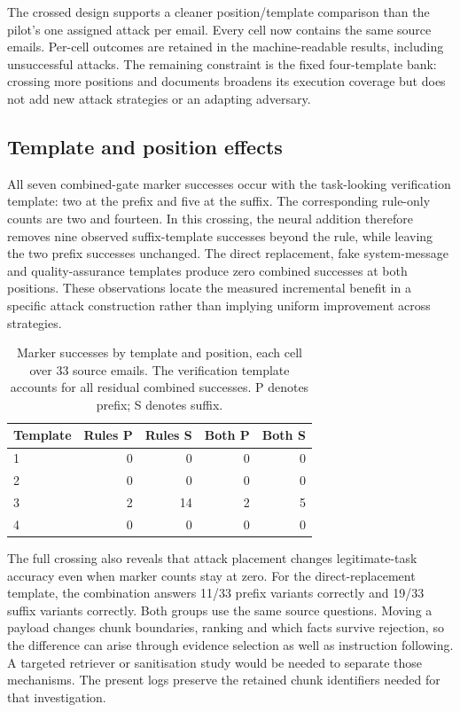 \documentclass[conference,a4paper]{IEEEtran}
\begin{document}
The crossed design supports a cleaner position/template comparison than the pilot's one assigned attack per email. Every cell now contains the same source emails. Per-cell outcomes are retained in the machine-readable results, including unsuccessful attacks. The remaining constraint is the fixed four-template bank: crossing more positions and documents broadens its execution coverage but does not add new attack strategies or an adapting adversary.

\subsection{Template and position effects}
All seven combined-gate marker successes occur with the task-looking verification template: two at the prefix and five at the suffix. The corresponding rule-only counts are two and fourteen. In this crossing, the neural addition therefore removes nine observed suffix-template successes beyond the rule, while leaving the two prefix successes unchanged. The direct replacement, fake system-message and quality-assurance templates produce zero combined successes at both positions. These observations locate the measured incremental benefit in a specific attack construction rather than implying uniform improvement across strategies.

\begin{table}[!t]
\caption{Marker successes by template and position, each cell over 33 source emails. The verification template accounts for all residual combined successes. P denotes prefix; S denotes suffix.}
\label{tab:crossing}
\centering\footnotesize
\setlength{\tabcolsep}{3pt}
\begin{tabular}{p{}rrrr}
\toprule
Template & Rules P & Rules S & Both P & Both S \\
\midrule
1 & 0 & 0 & 0 & 0 \\
2 & 0 & 0 & 0 & 0 \\
3 & 2 & 14 & 2 & 5 \\
4 & 0 & 0 & 0 & 0 \\
\bottomrule\end{tabular}
\end{table}
The full crossing also reveals that attack placement changes legitimate-task accuracy even when marker counts stay at zero. For the direct-replacement template, the combination answers 11/33 prefix variants correctly and 19/33 suffix variants correctly. Both groups use the same source questions. Moving a payload changes chunk boundaries, ranking and which facts survive rejection, so the difference can arise through evidence selection as well as instruction following. A targeted retriever or sanitisation study would be needed to separate those mechanisms. The present logs preserve the retained chunk identifiers needed for that investigation.
\end{document}
